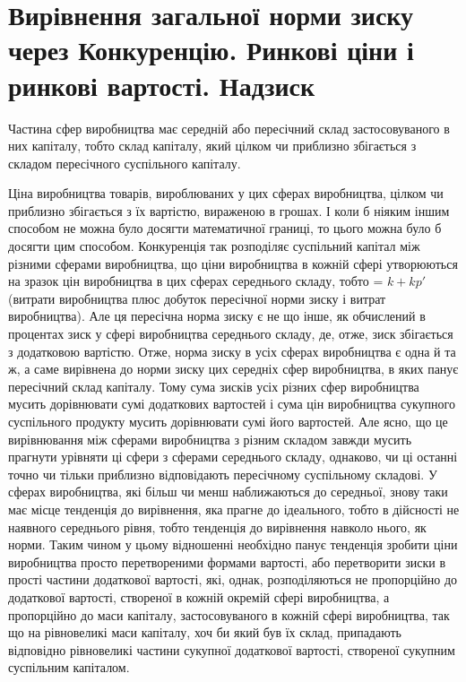 
\section{Вирівнення загальної норми зиску через
Конкуренцію. Ринкові ціни і ринкові вартості.
Надзиск}

Частина сфер виробництва має середній або пересічний склад
застосовуваного в них капіталу, тобто склад капіталу, який цілком чи приблизно збігається з складом
пересічного суспільного
капіталу.

Ціна виробництва товарів, вироблюваних у цих сферах виробництва, цілком чи приблизно збігається з їх
вартістю, вираженою
в грошах. І коли б ніяким іншим способом не можна було досягти математичної границі, то цього можна
було б досягти цим
способом. Конкуренція так розподіляє суспільний капітал між
різними сферами виробництва, що ціни виробництва в кожній
сфері утворюються на зразок цін виробництва в цих сферах
середнього складу, тобто = $k + kp'$ (витрати виробництва плюс
добуток пересічної норми зиску і витрат виробництва). Але
ця пересічна норма зиску є не що інше, як обчислений в процентах зиск у сфері виробництва середнього
складу, де, отже,
зиск збігається з додатковою вартістю. Отже, норма зиску в усіх
сферах виробництва є одна й та ж, а саме вирівнена до норми
зиску цих середніх сфер виробництва, в яких панує пересічний
склад капіталу. Тому сума зисків усіх різних сфер виробництва
мусить дорівнювати сумі додаткових вартостей і сума цін виробництва сукупного суспільного продукту
мусить дорівнювати
сумі його вартостей. Але ясно, що це вирівнювання між сферами виробництва з різним складом завжди
мусить прагнути
урівняти ці сфери з сферами середнього складу, однаково, чи
ці останні точно чи тільки приблизно відповідають пересічному
суспільному складові. У сферах виробництва, які більш чи менш
наближаються до середньої, знову таки має місце тенденція
до вирівнення, яка прагне до ідеального, тобто в дійсності не
наявного середнього рівня, тобто тенденція до вирівнення
навколо нього, як норми. Таким чином у цьому відношенні
необхідно панує тенденція зробити ціни виробництва просто
перетвореними формами вартості, або перетворити зиски в
прості частини додаткової вартості, які, однак, розподіляються
не пропорційно до додаткової вартості, створеної в кожній
окремій сфері виробництва, а пропорційно до маси капіталу,
застосовуваного в кожній сфері виробництва, так що на рівновеликі маси капіталу, хоч би який був їх
склад, припадають відповідно рівновеликі частини сукупної додаткової вартості, створеної сукупним
суспільним капіталом.

